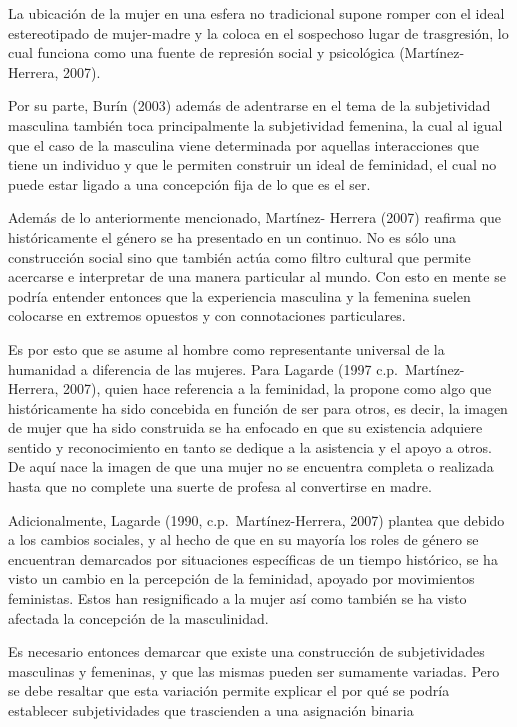La ubicación de la mujer en una esfera no tradicional supone romper con el ideal
estereotipado de mujer-madre y la coloca en el sospechoso lugar de trasgresión,
lo cual funciona como una fuente de represión social y psicológica
(Martínez-Herrera, 2007).

Por su parte, Burín (2003) además de adentrarse en el tema de la subjetividad
masculina también toca principalmente la subjetividad femenina, la cual al igual
que el caso de la masculina viene determinada por aquellas interacciones que
tiene un individuo y que le permiten construir un ideal de feminidad, el cual no
puede estar ligado a una concepción fija de lo que es el ser.

Además de lo anteriormente mencionado, Martínez- Herrera (2007) reafirma que
históricamente el género se ha presentado en un continuo.
No es sólo una construcción social sino que también actúa como filtro cultural
que permite acercarse e interpretar de una manera particular al mundo.
Con esto en mente se podría entender entonces que la experiencia masculina y la
femenina suelen colocarse en extremos opuestos y con connotaciones particulares.

Es por esto que se asume al hombre como representante universal de la humanidad
a diferencia de las mujeres.
Para Lagarde (1997 c.p.~Martínez-Herrera, 2007), quien hace referencia a la
feminidad, la propone como algo que históricamente ha sido concebida en función
de ser para otros, es decir, la imagen de mujer que ha sido construida se ha
enfocado en que su existencia adquiere sentido y reconocimiento en tanto se
dedique a la asistencia y el apoyo a otros.
De aquí nace la imagen de que una mujer no se encuentra completa o realizada
hasta que no complete una suerte de profesa al convertirse en madre.

Adicionalmente, Lagarde (1990, c.p.~Martínez-Herrera, 2007) plantea que
debido a los cambios sociales, y al hecho de que en su mayoría los roles de
género se encuentran demarcados por situaciones específicas de un tiempo
histórico, se ha visto un cambio en la percepción de la feminidad, apoyado por
movimientos feministas.
Estos han resignificado a la mujer así como también se ha visto afectada la
concepción de la masculinidad.

Es necesario entonces demarcar que existe una construcción de subjetividades
masculinas y femeninas, y que las mismas pueden ser sumamente variadas.
Pero se debe resaltar que esta variación permite explicar el por qué se podría
establecer subjetividades que trascienden a una asignación binaria

